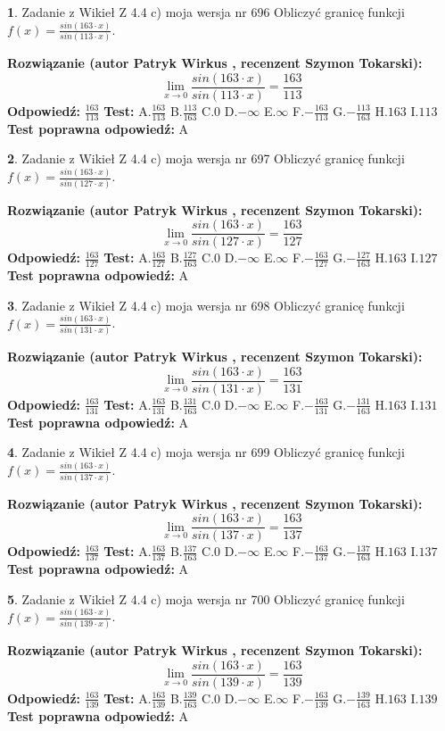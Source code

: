 \documentclass[12pt, a4paper]{article}
\theoremstyle{definition} %
\newtheorem{zad}{}
\newcommand{\zadStart}[1]{\begin{zad}#1\newline}
\newcommand{\zadStop}{\end{zad}}
\newcommand{\rozwStart}[2]{\noindent \textbf{Rozwiązanie (autor #1 , recenzent #2): }\newline}
\newcommand{\rozwStop}{\newline}
\newcommand{\odpStart}{\noindent \textbf{Odpowiedź:}\newline}
\newcommand{\odpStop}{\newline}
\newcommand{\testStart}{\noindent \textbf{Test:}\newline}
\newcommand{\testStop}{\newline}
\newcommand{\kluczStart}{\noindent \textbf{Test poprawna odpowiedź:}\newline}
\newcommand{\kluczStop}{\newline}
\begin{document}
\zadStart{Zadanie z Wikieł Z 4.4 c) moja wersja nr 696}
Obliczyć granicę funkcji $f(x)=\frac{sin(163\cdot x)}{sin(113\cdot x)}$.
\zadStop
\rozwStart{Patryk Wirkus}{Szymon Tokarski}
$$\lim\limits_{x\to 0}\frac{sin(163\cdot x)}{sin(113\cdot x)}=
\frac{163}{113}$$
\rozwStop
\odpStart
$\frac{163}{113}$
\odpStop
\testStart
A.$\frac{163}{113}$
B.$\frac{113}{163}$
C.$0$
D.$-\infty$
E.$\infty$
F.$-\frac{163}{113}$
G.$-\frac{113}{163}$
H.$163$
I.$113$
\testStop
\kluczStart
A
\kluczStop



\zadStart{Zadanie z Wikieł Z 4.4 c) moja wersja nr 697}
Obliczyć granicę funkcji $f(x)=\frac{sin(163\cdot x)}{sin(127\cdot x)}$.
\zadStop
\rozwStart{Patryk Wirkus}{Szymon Tokarski}
$$\lim\limits_{x\to 0}\frac{sin(163\cdot x)}{sin(127\cdot x)}=
\frac{163}{127}$$
\rozwStop
\odpStart
$\frac{163}{127}$
\odpStop
\testStart
A.$\frac{163}{127}$
B.$\frac{127}{163}$
C.$0$
D.$-\infty$
E.$\infty$
F.$-\frac{163}{127}$
G.$-\frac{127}{163}$
H.$163$
I.$127$
\testStop
\kluczStart
A
\kluczStop



\zadStart{Zadanie z Wikieł Z 4.4 c) moja wersja nr 698}
Obliczyć granicę funkcji $f(x)=\frac{sin(163\cdot x)}{sin(131\cdot x)}$.
\zadStop
\rozwStart{Patryk Wirkus}{Szymon Tokarski}
$$\lim\limits_{x\to 0}\frac{sin(163\cdot x)}{sin(131\cdot x)}=
\frac{163}{131}$$
\rozwStop
\odpStart
$\frac{163}{131}$
\odpStop
\testStart
A.$\frac{163}{131}$
B.$\frac{131}{163}$
C.$0$
D.$-\infty$
E.$\infty$
F.$-\frac{163}{131}$
G.$-\frac{131}{163}$
H.$163$
I.$131$
\testStop
\kluczStart
A
\kluczStop



\zadStart{Zadanie z Wikieł Z 4.4 c) moja wersja nr 699}
Obliczyć granicę funkcji $f(x)=\frac{sin(163\cdot x)}{sin(137\cdot x)}$.
\zadStop
\rozwStart{Patryk Wirkus}{Szymon Tokarski}
$$\lim\limits_{x\to 0}\frac{sin(163\cdot x)}{sin(137\cdot x)}=
\frac{163}{137}$$
\rozwStop
\odpStart
$\frac{163}{137}$
\odpStop
\testStart
A.$\frac{163}{137}$
B.$\frac{137}{163}$
C.$0$
D.$-\infty$
E.$\infty$
F.$-\frac{163}{137}$
G.$-\frac{137}{163}$
H.$163$
I.$137$
\testStop
\kluczStart
A
\kluczStop



\zadStart{Zadanie z Wikieł Z 4.4 c) moja wersja nr 700}
Obliczyć granicę funkcji $f(x)=\frac{sin(163\cdot x)}{sin(139\cdot x)}$.
\zadStop
\rozwStart{Patryk Wirkus}{Szymon Tokarski}
$$\lim\limits_{x\to 0}\frac{sin(163\cdot x)}{sin(139\cdot x)}=
\frac{163}{139}$$
\rozwStop
\odpStart
$\frac{163}{139}$
\odpStop
\testStart
A.$\frac{163}{139}$
B.$\frac{139}{163}$
C.$0$
D.$-\infty$
E.$\infty$
F.$-\frac{163}{139}$
G.$-\frac{139}{163}$
H.$163$
I.$139$
\testStop
\kluczStart
A
\kluczStop
\end{document}
